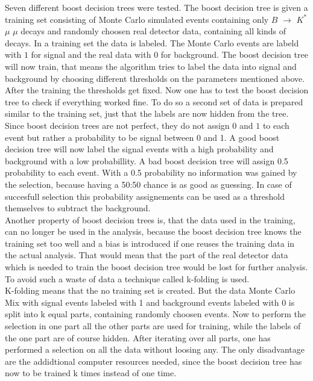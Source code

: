 \documentclass[english]{uzhpub}
\begin{document}
Seven different boost decision trees were tested. The boost decision tree is given a training set consisting of Monte Carlo simulated events containing only $B$ $\rightarrow$ $K^{*}$ $\mu$ $\mu$ decays and randomly choosen real detector data, containing all kinds of decays. In a training set the data is labeled. The Monte Carlo events are labeld with $1$ for signal and the real data with $0$ for background. The boost decision tree will now train, that means the algorithm tries to label the data into signal and background by choosing different thresholds on the parameters mentioned above. After the training the thresholds get fixed. Now one has to test the boost decision tree to check if everything worked fine. To do so a second set of data is prepared similar to the training set, just that the labels are now hidden from the tree. Since boost decision trees are not perfect, they do not assign $0$ and $1$ to each event but rather a probability to be signal between 0 and 1. A good boost decision tree will now label the signal events with a high probability and background with a low probabillity. A bad boost decision tree will assign 0.5 probability to each event.
With a 0.5 probability no information was gained by the selection, because having a 50:50 chance is as good as guessing. In case of succesfull selection this probability assignements can be used as a threshold themselves to subtract the background. \\
Another property of boost decision trees is, that the data used in the training, can no longer be used in the analysis, because the boost decision tree knows the training set too well and a bias is introduced if one reuses the training data in the actual analysis. That would mean that the part of the real detector data which is needed to train the boost decision tree would be lost for further analysis. To avoid such a waste of data a technique called k-folding is used. \\
K-folding means that the no training set is created. But the data Monte Carlo Mix with signal events labeled with 1 and background events labeled with 0 is split into k equal parts, containing randomly choosen events. Now to perform the selection in one part all the other parts are used for training, while the labels of the one part are of course hidden. After iterating over all parts, one has performed a selection on all the data without loosing any. The only disadvantage are the addidtional computer resources needed, since the boost decision tree has now to be trained k times instead of one time.
\end{document}
